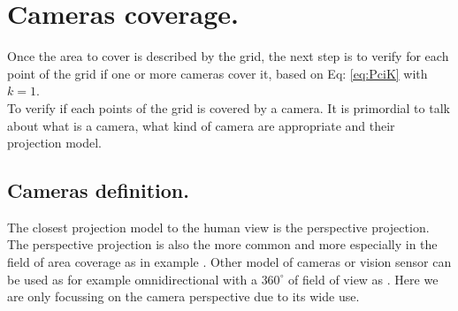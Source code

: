 \section{ Cameras coverage.}\label{sec:CamerasCoverage}


Once the area to cover is described by the grid, the next step is to verify for each point of the grid if one or more cameras cover it, based on Eq: \ref{eq:PciK} with $k=1$.\\
To verify if each points of the grid is covered by a camera. It is primordial to talk about what is a camera, what kind of camera are appropriate and their projection model. 

\subsection{ Cameras definition.}\label{sec:CamerasDefinition}

The closest projection model to the human view is the perspective projection. The perspective projection is also the more common and more especially in the field of area coverage as in example \cite{101*topcuoglu2009,33*reddy2012,8*zhou2011,82*chrysostomou2012,22*zhao2008}. Other model of cameras or vision sensor can be used as for example omnidirectional with a $360^{\circ}$ of field of view as \citep{43*erdem2006,150*chakrabarty2002,174*zhang2016}. 
Here we are only focussing  on the camera perspective due to its wide use.  \\

